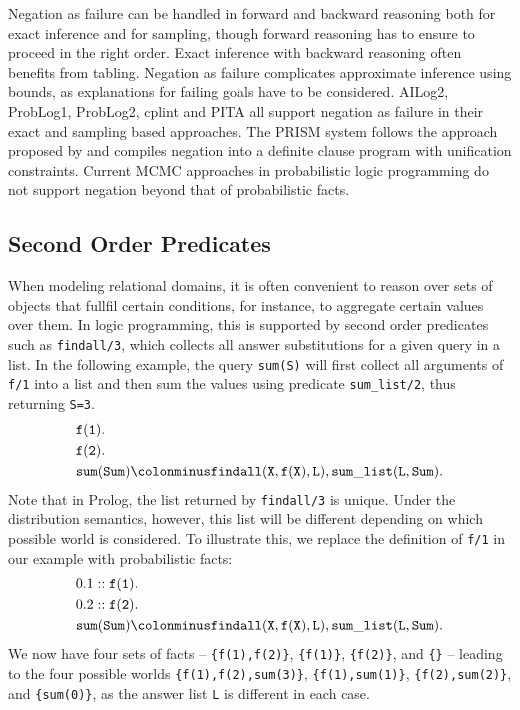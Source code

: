 \documentclass[a4paper]{article}
\begin{document}
Negation as failure can be handled in forward and backward reasoning
both for exact inference and for sampling, though forward reasoning has to ensure to proceed in
the right order. Exact inference with backward reasoning often
benefits from tabling. Negation as failure complicates approximate
inference using bounds, as explanations for failing goals have to be
considered. AILog2, ProbLog1, ProbLog2, cplint and PITA all support
negation as failure in their exact and sampling based approaches. The PRISM system follows the approach proposed by
\cite{sato:ijcai05} and compiles negation into a definite clause
program with unification constraints. Current MCMC approaches in probabilistic logic
programming do not support negation beyond that of probabilistic facts. 

\subsection{Second Order Predicates}
\label{sec:aggregation}
When modeling relational domains, it is often convenient to reason
over sets of objects that fullfil certain conditions, for instance, to
aggregate certain values over them. In logic programming, this is
supported by second order predicates such as \texttt{findall/3}, which
collects all answer substitutions for a given query in a list.  In the following example, the query \verb|sum(S)| will first collect all arguments of \verb|f/1| into a list and then sum the values using predicate \verb|sum_list/2|, thus returning \verb|S=3|.
\begin{align*}
&\mathtt{f(1).}\\
&\mathtt{f(2).}\\
&\mathtt{sum(Sum)}\colonminus\mathtt{findall(X,f(X),L), sum\_list(L,Sum).}
\end{align*}
Note that in Prolog, the list returned by \verb|findall/3| is unique. Under the distribution semantics, however, this list will be different depending on which possible world is considered. 
To illustrate this, we replace the definition of \verb|f/1| in our example with probabilistic facts:
\begin{align*}
&0.1::\mathtt{f(1).}\\
&0.2::\mathtt{f(2).}\\
&\mathtt{sum(Sum)}\colonminus\mathtt{findall(X,f(X),L), sum\_list(L,Sum).}
\end{align*}
We now have  four sets of facts -- \verb|{f(1),f(2)}|, \verb|{f(1)}|,
\verb|{f(2)}|, and \verb|{}| -- leading to the four possible worlds \verb|{f(1),f(2),sum(3)}|, \verb|{f(1),sum(1)}|,
\verb|{f(2),sum(2)}|, and \verb|{sum(0)}|, as the answer list \verb|L|
is different in each case. 
\end{document}

